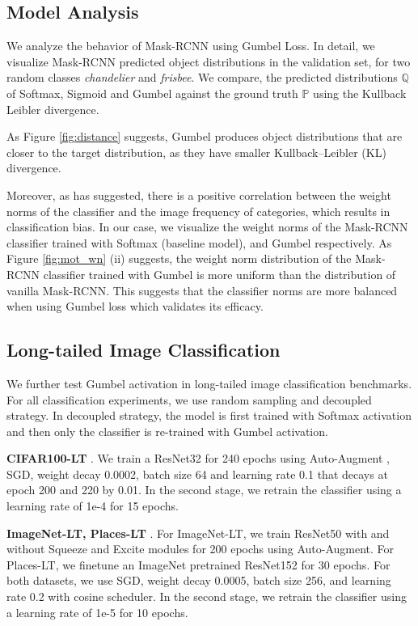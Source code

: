 \documentclass[runningheads]{llncs}
\begin{document}
\subsection{Model Analysis}
We analyze the behavior of Mask-RCNN using Gumbel Loss. In detail, we visualize Mask-RCNN predicted object distributions in the validation set, for two random classes \textit{chandelier} and \textit{frisbee}. We compare, the predicted distributions $\mathbb{Q}$ of Softmax, Sigmoid and Gumbel against the ground truth $\mathbb{P}$ using the Kullback Leibler divergence.

As Figure \ref{fig:distance} suggests, Gumbel produces object distributions that are closer to the target distribution, as they have smaller Kullback–Leibler (KL) divergence.

Moreover, as \cite{kang2019decoupling} has suggested, there is a positive correlation between the weight norms of the classifier and the image frequency of categories, which results in classification bias. In our case, we visualize the weight norms of the Mask-RCNN classifier trained with Softmax (baseline model), and Gumbel respectively. As Figure \ref{fig:mot_wn} (ii) suggests, the weight norm distribution of the Mask-RCNN classifier trained with Gumbel is more uniform than the distribution of vanilla Mask-RCNN. This suggests that the classifier norms are more balanced when using Gumbel loss which validates its efficacy.

\subsection{Long-tailed Image Classification}
We further test Gumbel activation in long-tailed image classification benchmarks. For all classification experiments, we use random sampling and decoupled strategy. In decoupled strategy, the model is first trained with Softmax activation and then only the classifier is re-trained with Gumbel activation.

\noindent\textbf{CIFAR100-LT} \cite{cao2019learning}. We train a ResNet32 for 240 epochs using Auto-Augment \cite{cubuk2019autoaugment}, SGD, weight decay 0.0002, batch size 64 and learning rate 0.1 that decays at epoch 200 and 220 by 0.01. In the second stage, we retrain the classifier using a learning rate of 1e-4 for 15 epochs.

\noindent\textbf{ImageNet-LT, Places-LT} \cite{liu2019large}. For ImageNet-LT, we train ResNet50 with and without Squeeze and Excite \cite{hu2018squeeze} modules for 200 epochs using Auto-Augment. For Places-LT, we finetune an ImageNet pretrained ResNet152 for 30 epochs. For both datasets, we use SGD, weight decay 0.0005, batch size 256, and learning rate 0.2 with cosine scheduler. In the second stage, we retrain the classifier using a learning rate of 1e-5 for 10 epochs. 
\end{document}
